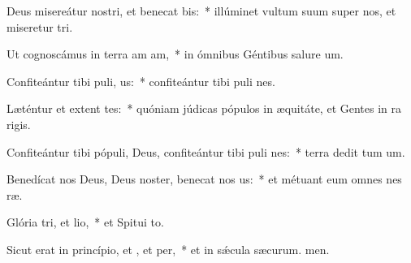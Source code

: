 \item Deus misereátur nostri, et benecat bis:~* illúminet vultum suum super nos, et miseretur tri.
\item Ut cognoscámus in terra am am,~* in ómnibus Géntibus salure um.
\item Confiteántur tibi puli, us:~* confiteántur tibi puli nes.
\item Læténtur et extent tes:~* quóniam júdicas pópulos in æquitáte, et Gentes in ra rigis.
\item Confiteántur tibi pópuli, Deus, confiteántur tibi puli nes:~* terra dedit tum um.
\item Benedícat nos Deus, Deus noster, benecat nos us:~* et métuant eum omnes nes ræ.
\item Glória tri, et lio,~* et Spitui to.
\item Sicut erat in princípio, et , et per,~* et in sǽcula sæcurum. men.
